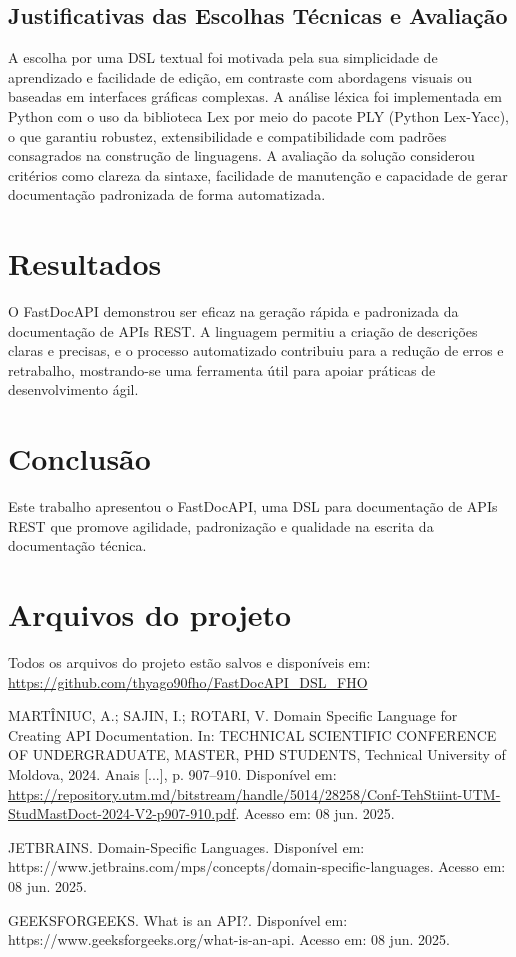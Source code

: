\documentclass[conference]{IEEEtran}
\begin{document}
\subsection{Justificativas das Escolhas Técnicas e Avaliação}
A escolha por uma DSL textual foi motivada pela sua simplicidade de aprendizado e facilidade de edição, em contraste com abordagens visuais ou baseadas em interfaces gráficas complexas. A análise léxica foi implementada em Python com o uso da biblioteca Lex por meio do pacote PLY (Python Lex-Yacc), o que garantiu robustez, extensibilidade e compatibilidade com padrões consagrados na construção de linguagens. A avaliação da solução considerou critérios como clareza da sintaxe, facilidade de manutenção e capacidade de gerar documentação padronizada de forma automatizada.

\section{Resultados}
O FastDocAPI demonstrou ser eficaz na geração rápida e padronizada da documentação de APIs REST. A linguagem permitiu a criação de descrições claras e precisas, e o processo automatizado contribuiu para a redução de erros e retrabalho, mostrando-se uma ferramenta útil para apoiar práticas de desenvolvimento ágil.

\section{Conclusão}
Este trabalho apresentou o FastDocAPI, uma DSL para documentação de APIs REST que promove agilidade, padronização e qualidade na escrita da documentação técnica.

\section{Arquivos do projeto}
Todos os arquivos do projeto estão salvos e disponíveis em: \url{https://github.com/thyago90fho/FastDocAPI_DSL_FHO} 

\begin{thebibliography}{00}

 MARTÎNIUC, A.; SAJIN, I.; ROTARI, V. Domain Specific Language for Creating API Documentation. In: TECHNICAL SCIENTIFIC CONFERENCE OF UNDERGRADUATE, MASTER, PHD STUDENTS, Technical University of Moldova, 2024. Anais [...], p. 907--910. Disponível em: \url{https://repository.utm.md/bitstream/handle/5014/28258/Conf-TehStiint-UTM-StudMastDoct-2024-V2-p907-910.pdf}. Acesso em: 08 jun. 2025.


 JETBRAINS. Domain-Specific Languages. Disponível em: https://www.jetbrains.com/mps/concepts/domain-specific-languages. Acesso em: 08 jun. 2025.

 GEEKSFORGEEKS. What is an API?. Disponível em: https://www.geeksforgeeks.org/what-is-an-api. Acesso em: 08 jun. 2025.

\end{thebibliography}
\end{document}
